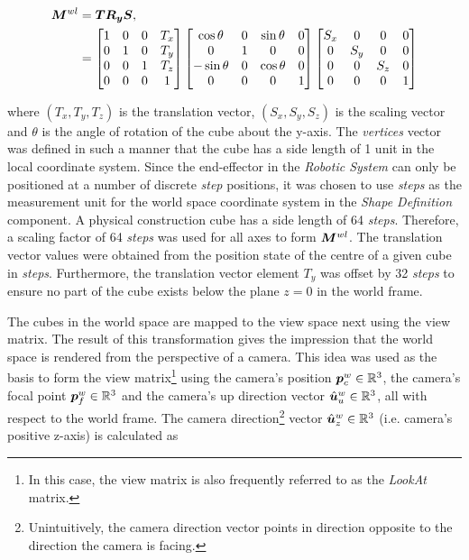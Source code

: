 \begin{align}
	\bm{M}^{wl}&=\bm{T}\bm{R_y}\bm{S},\\
	&=
	\begin{bmatrix}
		1 & 0 & 0 & T_x\\
		0 & 1 & 0 & T_y\\
		0 & 0 & 1 & T_z\\
		0 & 0 & 0 & 1
	\end{bmatrix}
	\begin{bmatrix}
		\cos\theta & 0 & \sin\theta & 0\\
		0 & 1 & 0 & 0\\
		-\sin\theta & 0 & \cos\theta & 0\\
		0 & 0 & 0 & 1
	\end{bmatrix}
	\begin{bmatrix}
		S_x & 0 & 0 & 0\\
		0 & S_y & 0 & 0\\
		0 & 0 & S_z & 0\\
		0 & 0 & 0 & 1
	\end{bmatrix}
\end{align}

where $(T_x, T_y, T_z)$ is the translation vector, $(S_x, S_y, S_z)$ is the scaling vector and $\theta$ is the angle of rotation of the cube about the y-axis. The \textit{vertices} vector was defined in such a manner that the cube has a side length of 1 unit in the local coordinate system. Since the end-effector in the \textit{Robotic System} can only be positioned at a number of discrete \textit{step} positions, it was chosen to use \textit{steps} as the measurement unit for the world space coordinate system in the \textit{Shape Definition} component. A physical construction cube has a side length of 64 \textit{steps}. Therefore, a scaling factor of 64 \textit{steps} was used for all axes to form $\bm{M}^{wl}$. The translation vector values were obtained from the position state of the centre of a given cube in \textit{steps}. Furthermore, the translation vector element $T_y$ was offset by 32 \textit{steps} to ensure no part of the cube exists below the plane $z=0$ in the world frame.

The cubes in the world space are mapped to the view space next using the view matrix. The result of this transformation gives the impression that the world space is rendered from the perspective of a camera. This idea was used as the basis to form the view matrix\footnote{In this case, the view matrix is also frequently referred to as the \textit{LookAt} matrix.} using the camera's position $\bm{p}^w_c\in\mathbb{R}^3$, the camera's focal point $\bm{p}^w_f\in\mathbb{R}^3$ and the camera's up direction vector $\hat{\bm{u}}^w_u\in\mathbb{R}^3$, all with respect to the world frame. The camera direction\footnote{Unintuitively, the camera direction vector points in direction opposite to the direction the camera is facing.} vector $\hat{\bm{u}}^w_z\in\mathbb{R}^3$ (i.e. camera's positive z-axis) is calculated as

